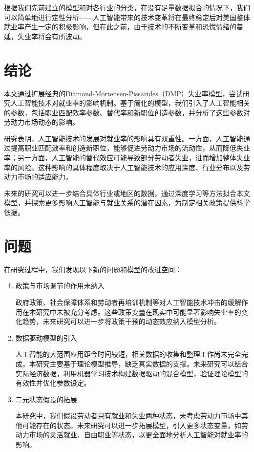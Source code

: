 \documentclass{article}
\begin{document}
根据我们先前建立的模型和对各行业的分类，在没有足量数据拟合的情况下，我们可以简单地进行定性分析——人工智能带来的技术变革将在最终稳定后对美国整体就业率产生一定的积极影响，但在此之前，由于技术的不断变革和恐慌情绪的蔓延，失业率将会有所波动。

\section{结论}
本文通过扩展经典的Diamond-Mortensen-Pissarides（DMP）失业率模型，尝试研究人工智能技术对就业率的影响机制。基于简化的模型，我们引入了人工智能相关的参数，包括职业匹配效率参数、替代率和新职位创造参数，并分析了这些参数对劳动力市场动态的影响。

研究表明，人工智能技术的发展对就业率的影响具有双重性。一方面，人工智能通过提高职业匹配效率和创造新职位，能够促进劳动力市场的流动性，从而降低失业率；另一方面，人工智能的替代效应可能导致部分劳动者失业，进而增加整体失业率的风险。这种影响的具体程度取决于人工智能技术的应用深度、行业分布以及劳动力市场的适应能力。

未来的研究可以进一步结合具体行业或地区的数据，通过深度学习等方法拟合本文模型，并探索更多影响人工智能与就业关系的潜在因素，为制定相关政策提供科学依据。

\section{问题}

在研究过程中，我们发现以下新的问题和模型的改进空间：

\begin{enumerate}[label=(\arabic*)]
    \item 政策与市场调节的作用未纳入
    
    政府政策、社会保障体系和劳动者再培训机制等对人工智能技术冲击的缓解作用在本研究中未被充分考虑。这些政策变量在现实中可能显著影响失业率的变化趋势，未来研究可以进一步将政策干预的动态效应纳入模型分析。

    \item 数据驱动模型的引入
    
    人工智能的大范围应用距今时间较短，相关数据的收集和整理工作尚未完全完成。本研究主要基于理论模型推导，缺乏真实数据的支撑。未来研究可以结合实际经济数据，利用机器学习技术构建数据驱动的混合模型，验证理论模型的有效性并优化参数设定。

    \item 二元状态假设的拓展
    
    本研究中，我们假设劳动者只有就业和失业两种状态，未考虑劳动力市场中其他可能存在的状态。未来研究可以进一步拓展模型，引入更多状态变量，如劳动力市场的灵活就业、自由职业等状态，以更全面地分析人工智能对就业率的影响。
\end{enumerate}

\newpage
{}
{}
\printbibliography[title={\zihao{-3} \heiti \centering 参\ 考\ 文\ 献}]
\end{document}
